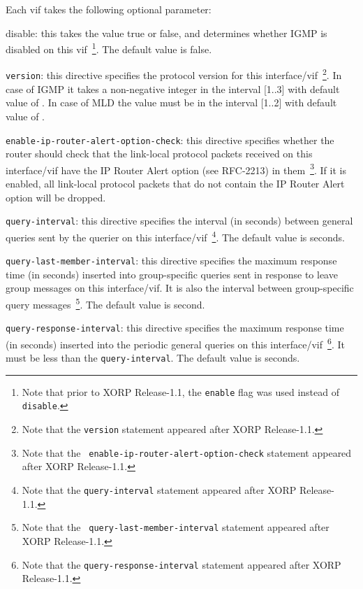 \begin{description}
\begin{description}
  Each vif takes the following optional parameter:
\begin{description}
\item{\stt disable}: this takes the value {\stt true} or {\stt false},
  and determines whether IGMP is disabled on this vif~\footnote{Note
  that prior to XORP Release-1.1, the {\tt enable} flag was used instead of
  {\tt disable}.}.
  The default value is {\stt false}.
\item{\tt version}: this directive specifies the protocol version for this
  interface/vif~\footnote{Note that the {\tt version} statement appeared after
  XORP Release-1.1.}. In case of IGMP it takes a non-negative integer in the
  interval [1..3] with default value of {}.  In case of MLD the value
  must be in the interval [1..2] with default value of {}.
\item{\tt enable-ip-router-alert-option-check}: this directive specifies
  whether the router should check that the link-local protocol packets
  received on this interface/vif have the IP Router Alert option (see
  RFC-2213) in them~\footnote{Note that the {\tt
  enable-ip-router-alert-option-check} statement appeared after XORP
  Release-1.1.}. If it is enabled, all link-local protocol packets that
  do not contain the IP Router Alert option will be dropped.

\item{\tt query-interval}: this directive specifies the interval (in seconds)
  between general queries sent by the querier on this
  interface/vif~\footnote{Note that the {\tt query-interval} statement
  appeared after XORP Release-1.1.}.
  The default value is {} seconds.

\item {\tt query-last-member-interval}: this directive specifies the maximum
  response time (in seconds) inserted into group-specific queries sent in
  response to leave group messages on this interface/vif. It is also the
  interval between group-specific query messages~\footnote{Note that the {\tt
  query-last-member-interval} statement appeared after XORP Release-1.1.}.
  The default value is {} second.

\item {\tt query-response-interval}: this directive specifies the maximum
  response time (in seconds) inserted into the periodic general queries on
  this interface/vif~\footnote{Note that the {\tt query-response-interval}
  statement appeared after XORP Release-1.1.}.
  It must be less than the {\tt query-interval}.
  The default value is {} seconds.


\end{description}
\end{description}
\end{description}

